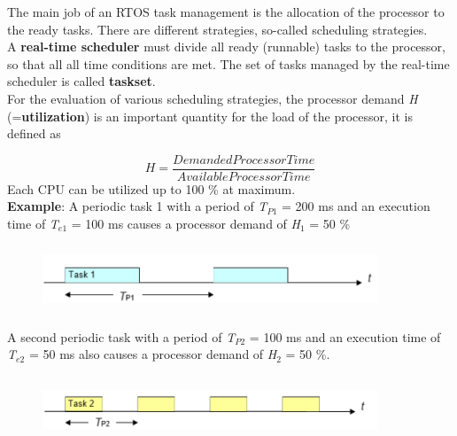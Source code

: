 The main job of an RTOS task management is the allocation of the processor to the ready tasks. There are different strategies, so-called scheduling strategies.\\

A \textbf{real-time scheduler} must divide all ready (runnable) tasks to the processor, so that all all time conditions are met. The set of tasks managed by the real-time scheduler is called \textbf{taskset}.\\

For the evaluation of various scheduling strategies, the processor demand \textit{H} (=\textbf{utilization}) is an important quantity for the load of the processor, it is defined as

\begin{equation}
	H = \frac{Demanded Processor Time}{Available Processor Time}
\label{EQ 3}
\end{equation}
\newline
Each CPU can be utilized up to 100 \% at maximum.\\

\textbf{Example}: A periodic task 1 with a period of \textit{T}${}_{P1}$ = 200 ms and an execution time of \textit{T}${}_{e1}$ = 100 ms causes a processor demand of \textit{H}${}_{1}$ = 50 \%

	\begin{figure}[h]
    \centering
    \includegraphics[width=10cm, height=2cm]{Images/image83.png}
    \label{fig:Fig 29}
    \end{figure}
\newpage
A second periodic task with a period of \textit{T}${}_{P2}$ = 100 ms and an execution time of \textit{T}${}_{e2}$ = 50 ms also causes a processor demand of \textit{H}${}_{2}$ = 50 \%.

	\begin{figure}[h]
    \centering
    \includegraphics[width=10cm, height=2cm]{Images/image84.png}
    \label{fig:Fig 30}
    \end{figure} 

